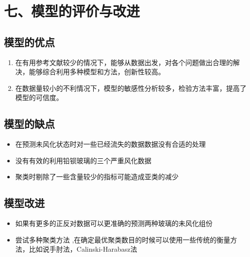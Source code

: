 \documentclass{my_paper}
\begin{document}
  \newpage

\section{七、模型的评价与改进}

\subsection{模型的优点}
\begin{enumerate}
    \item 在有用参考文献较少的情况下，能够从数据出发，对各个问题做出合理的解决，能够综合利用多种模型和方法，创新性较高。
    \item 在数据量较小的不利情况下，模型的敏感性分析较多，检验方法丰富，提高了模型的可信度。

\end{enumerate}

\subsection{模型的缺点}
\begin{itemize}
    \item 在预测未风化状态时对一些已经流失的数据数据没有合适的处理
    \item 没有有效的利用铅钡玻璃的三个严重风化数据
    \item 聚类时剔除了一些含量较少的指标可能造成亚类的减少
\end{itemize}

\subsection{模型改进}
\begin{itemize}
  \item 如果有更多的正反对数据可以更准确的预测两种玻璃的未风化组份
  \item 尝试多种聚类方法 ,在确定最优聚类数目的时候可以使用一些传统的衡量方法，比如说手肘法，Calinski-Harabasz法
  
\end{itemize}

\newpage
\begin{center}
\end{center}

\newpage
\end{document}
